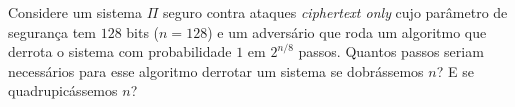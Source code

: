 \begin{exercicio}
  Considere um sistema $\Pi$ seguro contra ataques {\em ciphertext only} cujo parâmetro de segurança tem $128$ bits ($n = 128$) e um adversário que roda um algoritmo que derrota o sistema com probabilidade $1$ em $2^{n/8}$ passos.
  Quantos passos seriam necessários para esse algoritmo derrotar um sistema se dobrássemos $n$? E se quadrupicássemos $n$?
\end{exercicio}